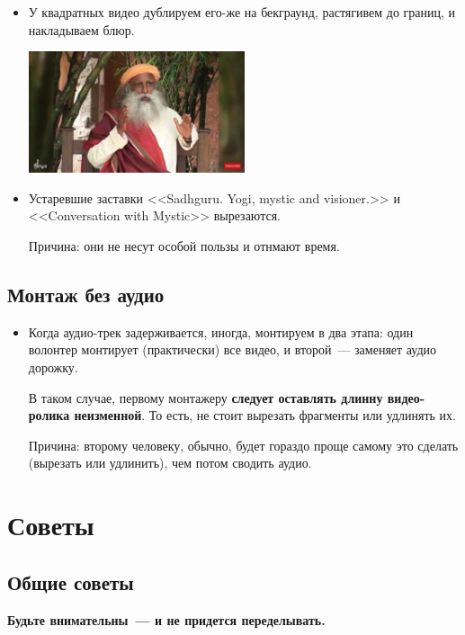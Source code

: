 \documentclass[
a4paper, %
12pt, %
article,
onecolumn, %
openany, %
]{memoir}
\begin{document}
\begin{itemize}

\item У квадратных видео дублируем его-же на бекграунд, растягивем до границ, и накладываем блюр.

	\begin{center} \includegraphics[width=0.5\textwidth]{tooWide}  \end{center}

\item Устаревшие заставки <<Sadhguru. Yogi, mystic and visioner.>> и <<Conversation with Mystic>> вырезаются. 

    {\color{gray}Причина: они не несут особой пользы и отнмают время.}
\end{itemize}


\subsection{Монтаж без аудио}

\begin{itemize}
\item Когда аудио-трек задерживается, иногда, монтируем в два
    этапа: один волонтер монтирует (практически) все видео, и 
    второй~--- заменяет аудио дорожку.

    В таком случае, первому монтажеру \textbf{следует оставлять 
    длинну видео-ролика неизменной}. То есть, не стоит вырезать
    фрагменты или удлинять их.

    Причина: второму человеку, обычно, будет гораздо проще 
    самому это сделать (вырезать или удлинить), чем потом сводить аудио.
\end{itemize}

\newpage
\section{Советы}\label{advices}

\subsection{Общие советы}
\textbf{Будьте внимательны~--- и не придется переделывать.}
\end{document}
